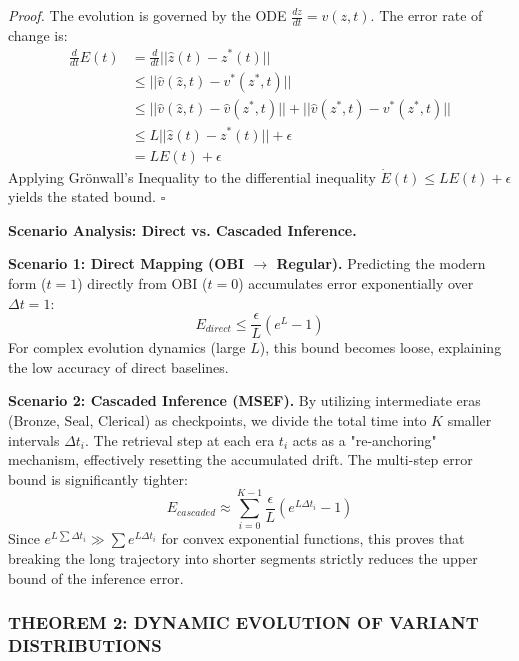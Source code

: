 \documentclass{article}
\begin{document}
\textit{Proof.} The evolution is governed by the ODE $\frac{dz}{dt} = v(z,t)$. The error rate of change is:
\begin{equation}
\begin{split}
    \frac{d}{dt}E(t) &= \frac{d}{dt}||\hat{z}(t) - z^*(t)|| \\
    &\le ||\hat{v}(\hat{z}, t) - v^*(z^*, t)|| \\
    &\le ||\hat{v}(\hat{z}, t) - \hat{v}(z^*, t)|| + ||\hat{v}(z^*, t) - v^*(z^*, t)|| \\
    &\le L||\hat{z}(t) - z^*(t)|| + \epsilon \\
    &= L E(t) + \epsilon
\end{split}
\end{equation}
Applying Grönwall's Inequality to the differential inequality $\dot{E}(t) \le L E(t) + \epsilon$ yields the stated bound. \hfill $\square$

\textbf{Scenario Analysis: Direct vs. Cascaded Inference.}

\textbf{Scenario 1: Direct Mapping (OBI $\to$ Regular).}
Predicting the modern form ($t=1$) directly from OBI ($t=0$) accumulates error exponentially over $\Delta t = 1$:
\begin{equation}
    E_{direct} \le \frac{\epsilon}{L}(e^{L} - 1)
\end{equation}
For complex evolution dynamics (large $L$), this bound becomes loose, explaining the low accuracy of direct baselines.

\textbf{Scenario 2: Cascaded Inference (MSEF).}
By utilizing intermediate eras (Bronze, Seal, Clerical) as checkpoints, we divide the total time into $K$ smaller intervals $\Delta t_i$. The retrieval step at each era $t_i$ acts as a "re-anchoring" mechanism, effectively resetting the accumulated drift. The multi-step error bound is significantly tighter:
\begin{equation}
    E_{cascaded} \approx \sum_{i=0}^{K-1} \frac{\epsilon}{L}(e^{L \Delta t_i} - 1)
\end{equation}
Since $e^{L \sum \Delta t_i} \gg \sum e^{L \Delta t_i}$ for convex exponential functions, this proves that breaking the long trajectory into shorter segments strictly reduces the upper bound of the inference error.



\subsubsection{THEOREM 2: DYNAMIC EVOLUTION OF VARIANT DISTRIBUTIONS}
\end{document}
